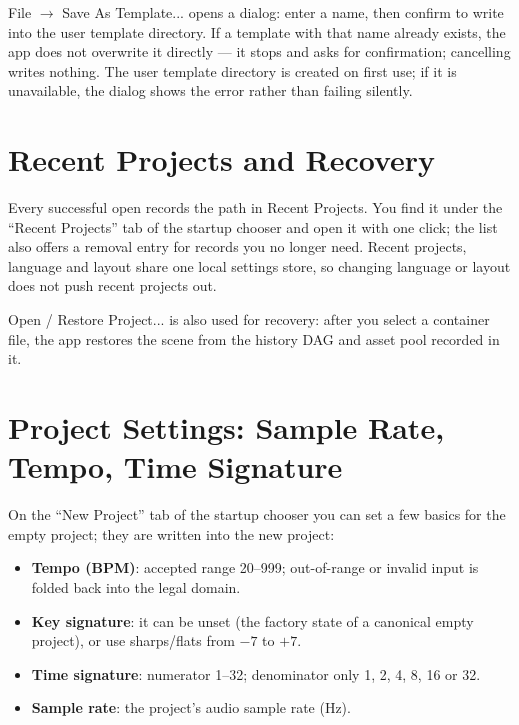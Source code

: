 File $\to$ Save As Template... opens a dialog: enter a name, then confirm to write
into the user template directory. If a template with that name already exists, the
app does not overwrite it directly — it stops and asks for confirmation; cancelling
writes nothing. The user template directory is created on first use; if it is
unavailable, the dialog shows the error rather than failing silently.


\section{Recent Projects and Recovery}

Every successful open records the path in Recent Projects. You find it under the
``Recent Projects'' tab of the startup chooser and open it with one click; the list
also offers a removal entry for records you no longer need. Recent projects, language
and layout share one local settings store, so changing language or layout does not
push recent projects out.

Open / Restore Project... is also used for recovery: after you select a container
file, the app restores the scene from the history DAG and asset pool recorded in it.

\section{Project Settings: Sample Rate, Tempo, Time Signature}

On the ``New Project'' tab of the startup chooser you can set a few basics for the
empty project; they are written into the new project:

\begin{itemize}
  \item \textbf{Tempo (BPM)}: accepted range 20--999; out-of-range or invalid input is folded back into the legal domain.
  \item \textbf{Key signature}: it can be unset (the factory state of a canonical empty project), or use sharps/flats from $-7$ to $+7$.
  \item \textbf{Time signature}: numerator 1--32; denominator only 1, 2, 4, 8, 16 or 32.
  \item \textbf{Sample rate}: the project's audio sample rate (Hz).
\end{itemize}


